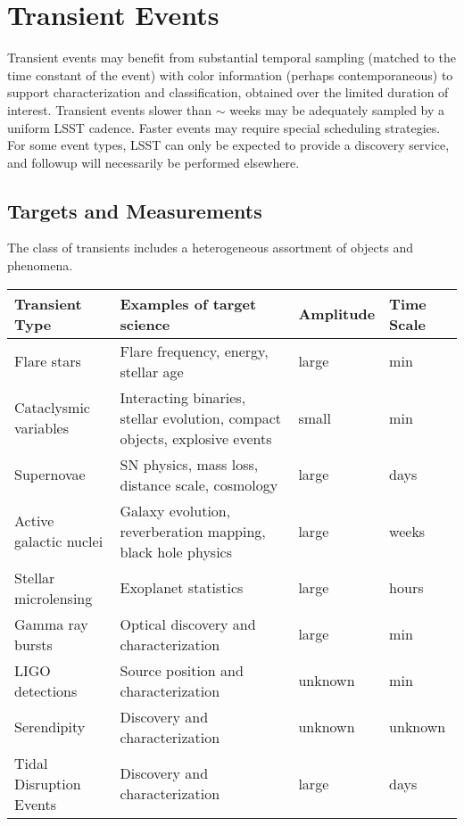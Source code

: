 \section{Transient Events}
\def\secname{transients}\label{sec:\secname}


Transient events may benefit from substantial temporal sampling
(matched to the time constant of the event) with color information
(perhaps contemporaneous) to support characterization and
classification, obtained over the limited duration of interest.
Transient events slower than $\sim$ weeks may be adequately sampled by
a uniform LSST cadence.  Faster events may require special scheduling
strategies.  For some event types, LSST can only be expected to
provide a discovery service, and followup will necessarily be
performed elsewhere.


\subsection{Targets and Measurements}
\label{sec:\secname:targets}

The class of transients includes a heterogeneous assortment of objects and phenomena.

\begin{center}
\begin{tabular}{| p{3cm} | p{8cm} | l | l |}
\hline Transient Type & Examples of target science & Amplitude & Time Scale\\
\hline
Flare stars & Flare frequency, energy, stellar age & large & min\\
Cataclysmic variables  & Interacting binaries, stellar evolution, compact objects, explosive events & small & min\\
Supernovae & SN physics, mass loss, distance scale, cosmology& large & days\\
Active galactic nuclei & Galaxy evolution, reverberation mapping, black hole physics& large & weeks\\
Stellar microlensing & Exoplanet statistics& large & hours\\
Gamma ray bursts & Optical discovery and characterization& large & min\\
LIGO detections & Source position and characterization& unknown & min\\
Serendipity & Discovery and characterization& unknown & unknown\\
Tidal Disruption Events & Discovery and characterization & large & days\\
 \hline \end{tabular}
 \end{center}

